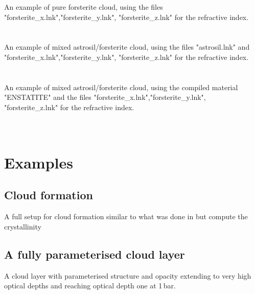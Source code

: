 \documentclass[12pt]{article}
\begin{document}
An example of pure forsterite cloud, using the files "forsterite\_x.lnk","forsterite\_y.lnk", "forsterite\_z.lnk" for the refractive index.
\\
\\
\\
An example of mixed astrosil/forsterite cloud, using the files "astrosil.lnk" and "forsterite\_x.lnk","forsterite\_y.lnk", "forsterite\_z.lnk" for the refractive index.
\\
\\
\\
An example of mixed astrosil/forsterite cloud, using the compiled material "ENSTATITE" and the files "forsterite\_x.lnk","forsterite\_y.lnk", "forsterite\_z.lnk" for the refractive index.
\\
\\
\\

\section{Examples}

\subsection{Cloud formation}
A full setup for cloud formation similar to what was done in \cite{2020A&A...642A..28M} but compute the crystallinity
\\

\subsection{A fully parameterised cloud layer}
A cloud layer with parameterised structure and opacity extending to very high optical depths and reaching optical depth one at 1\,bar.
\\
\\
\\


\end{document}
